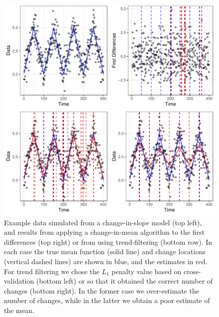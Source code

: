 \documentclass[nojss]{jss}
\begin{document}
\begin{figure}
\centering
\includegraphics[scale=1.4]{figures/change_in_slope_examples_ggplot.pdf}
\caption{ Example data simulated from a change-in-slope model (top left), and results from applying a change-in-mean algorithm to the first differences (top right) or from using trend-filtering (bottom row). In each case the true mean function (solid line) and change locations (vertical dashed lines) are shown in blue, and the estimates in red.  For trend filtering we chose the $L_1$ penalty value based on cross-validation (bottom left) or so that it obtained the correct number of changes (bottom right). In the former case we over-estimate the number of changes, while in the latter we obtain a poor estimate of the mean.
\label{fig:intro}}
\end{figure}
\end{document}
